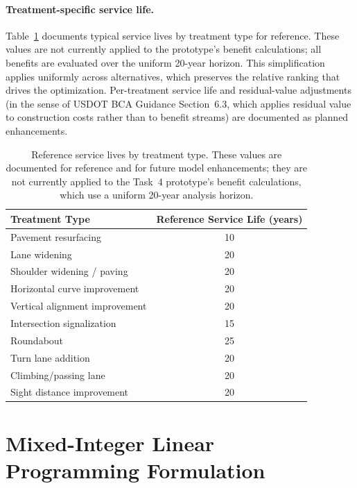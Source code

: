 \paragraph{Treatment-specific service life.} Table~\ref{tab:service-life}
documents typical service lives by treatment type for reference. These values
are not currently applied to the prototype's benefit calculations; all benefits
are evaluated over the uniform 20-year horizon. This simplification applies
uniformly across alternatives, which preserves the relative ranking that drives
the optimization. Per-treatment service life and residual-value adjustments
(in the sense of USDOT BCA Guidance Section~6.3, which applies residual value
to construction costs rather than to benefit streams) are documented as
planned enhancements.

\begin{table}[H]
\centering
\caption{Reference service lives by treatment type. These values are
documented for reference and for future model enhancements; they are not
currently applied to the Task~4 prototype's benefit calculations, which use a
uniform 20-year analysis horizon.}
\label{tab:service-life}
\begin{tabular}{lc}
\toprule
\textbf{Treatment Type} & \textbf{Reference Service Life (years)} \\
\midrule
Pavement resurfacing                  & 10 \\
Lane widening                         & 20 \\
Shoulder widening / paving            & 20 \\
Horizontal curve improvement          & 20 \\
Vertical alignment improvement        & 20 \\
Intersection signalization            & 15 \\
Roundabout                            & 25 \\
Turn lane addition                    & 20 \\
Climbing/passing lane                 & 20 \\
Sight distance improvement            & 20 \\
\bottomrule
\end{tabular}
\end{table}

\section{Mixed-Integer Linear Programming Formulation}
\label{sec:milp}

